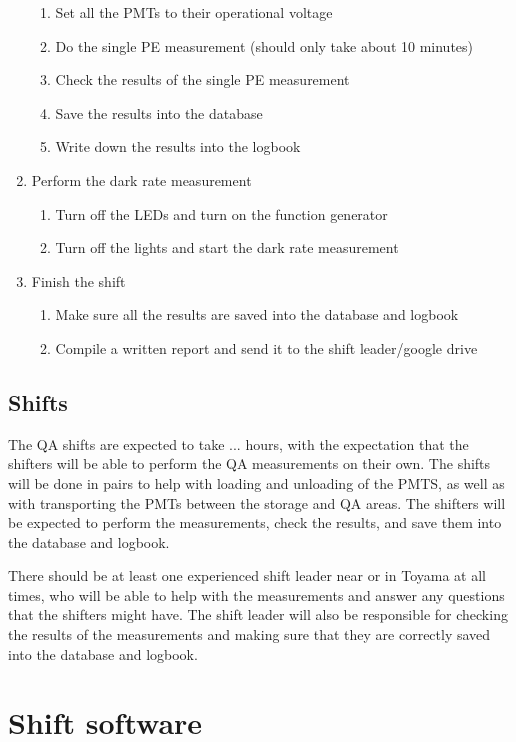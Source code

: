 \documentclass[12pt,a4paper]{article}
\begin{document}
\begin{enumerate}
\begin{enumerate}
      \item Set all the PMTs to their operational voltage
      \item Do the single PE measurement (should only take about 10 minutes)
      \item Check the results of the single PE measurement
      \item Save the results into the database
      \item Write down the results into the logbook
    \end{enumerate}
    \item Perform the dark rate measurement
    \begin{enumerate}
      \item Turn off the LEDs and turn on the function generator
      \item Turn off the lights and start the dark rate measurement
    \end{enumerate}
    \item Finish the shift
    \begin{enumerate}
      \item Make sure all the results are saved into the database and logbook
      \item Compile a written report and send it to the shift leader/google drive
    \end{enumerate}
\end{enumerate}

\subsection{Shifts}
The QA shifts are expected to take ... hours, with the expectation that the shifters will be able to perform the QA measurements on their own. The shifts will be done in pairs to help with loading and unloading of the PMTS, as well as with transporting the PMTs between the storage and QA areas. The shifters will be expected to perform the measurements, check the results, and save them into the database and logbook.

There should be at least one experienced shift leader near or in Toyama at all times, who will be able to help with the measurements and answer any questions that the shifters might have. The shift leader will also be responsible for checking the results of the measurements and making sure that they are correctly saved into the database and logbook.

\section{Shift software}
\end{document}
